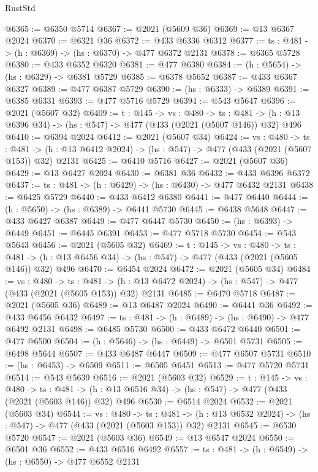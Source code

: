 \begin{lexlean}{RustStd}
\begin{coremodule}
@6365 := @6350 @5714
@6367 := @2021 (@5609 @36)
@6369 := @13 @6367 @2024
@6370 := @6321 @36
@6372 := @433 @6336 @6312
@6377 := {ts : @481} -> (h : @6369) -> (hs : @6370) -> @477 @6372 @2131
@6378 := @6365 @5728
@6380 := @433 @6352 @6320
@6381 := @477 @6380
@6384 := (h : @5654) -> (hs : @6329) -> @6381 @5729
@6385 := @6378 @5652
@6387 := @433 @6367 @6327
@6389 := @477 @6387 @5729
@6390 := (hs : @6333) -> @6389
@6391 := @6385 @6331
@6393 := @477 @5716 @5729
@6394 := @543 @5647
@6396 := @2021 (@5607 @32)
@6409 := {t : @145} ->
  {vs : @480} ->
  {ts : @481} -> (h : @13 @6396 @34) -> (hs : @547) -> @477 (@433 (@2021 (@5607 @146)) @32) @496
@6410 := @6394 @2024
@6412 := @2021 (@5607 @34)
@6424 := {vs : @480} ->
  {ts : @481} -> (h : @13 @6412 @2024) -> (hs : @547) -> @477 (@433 (@2021 (@5607 @153)) @32) @2131
@6425 := @6410 @5716
@6427 := @2021 (@5607 @36)
@6429 := @13 @6427 @2024
@6430 := @6381 @36
@6432 := @433 @6396 @6372
@6437 := {ts : @481} -> (h : @6429) -> (hs : @6430) -> @477 @6432 @2131
@6438 := @6425 @5729
@6440 := @433 @6412 @6380
@6441 := @477 @6440
@6444 := (h : @5650) -> (hs : @6389) -> @6441 @5730
@6445 := @6438 @5648
@6447 := @433 @6427 @6387
@6449 := @477 @6447 @5730
@6450 := (hs : @6393) -> @6449
@6451 := @6445 @6391
@6453 := @477 @5718 @5730
@6454 := @543 @5643
@6456 := @2021 (@5605 @32)
@6469 := {t : @145} ->
  {vs : @480} ->
  {ts : @481} -> (h : @13 @6456 @34) -> (hs : @547) -> @477 (@433 (@2021 (@5605 @146)) @32) @496
@6470 := @6454 @2024
@6472 := @2021 (@5605 @34)
@6484 := {vs : @480} ->
  {ts : @481} -> (h : @13 @6472 @2024) -> (hs : @547) -> @477 (@433 (@2021 (@5605 @153)) @32) @2131
@6485 := @6470 @5718
@6487 := @2021 (@5605 @36)
@6489 := @13 @6487 @2024
@6490 := @6441 @36
@6492 := @433 @6456 @6432
@6497 := {ts : @481} -> (h : @6489) -> (hs : @6490) -> @477 @6492 @2131
@6498 := @6485 @5730
@6500 := @433 @6472 @6440
@6501 := @477 @6500
@6504 := (h : @5646) -> (hs : @6449) -> @6501 @5731
@6505 := @6498 @5644
@6507 := @433 @6487 @6447
@6509 := @477 @6507 @5731
@6510 := (hs : @6453) -> @6509
@6511 := @6505 @6451
@6513 := @477 @5720 @5731
@6514 := @543 @5639
@6516 := @2021 (@5603 @32)
@6529 := {t : @145} ->
  {vs : @480} ->
  {ts : @481} -> (h : @13 @6516 @34) -> (hs : @547) -> @477 (@433 (@2021 (@5603 @146)) @32) @496
@6530 := @6514 @2024
@6532 := @2021 (@5603 @34)
@6544 := {vs : @480} ->
  {ts : @481} -> (h : @13 @6532 @2024) -> (hs : @547) -> @477 (@433 (@2021 (@5603 @153)) @32) @2131
@6545 := @6530 @5720
@6547 := @2021 (@5603 @36)
@6549 := @13 @6547 @2024
@6550 := @6501 @36
@6552 := @433 @6516 @6492
@6557 := {ts : @481} -> (h : @6549) -> (hs : @6550) -> @477 @6552 @2131

\end{coremodule}
\end{lexlean}
